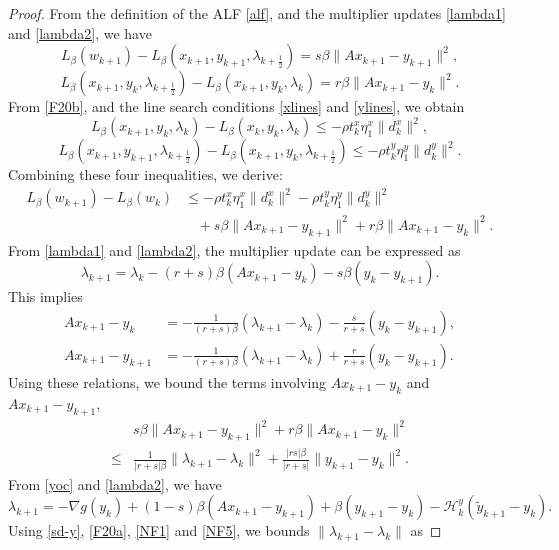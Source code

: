 \documentclass[pdflatex,sn-mathphys-num]{sn-jnl}%
\theoremstyle{thmstyleone}%
\theoremstyle{thmstyletwo}%
\theoremstyle{thmstylethree}%
\begin{document}
\begin{proof} From the definition of the ALF \eqref{alf}, and the multiplier updates \eqref{lambda1} and \eqref{lambda2}, we have
	\[
	L_{\beta}(w_{k+1})-L_{\beta}(x_{k+1}, y_{k+1}, \lambda_{k+\frac{1}{2}})=s \beta\|A x_{k+1}-y_{k+1}\|^{2},\]
	\[L_{\beta}(x_{k+1}, y_{k}, \lambda_{k+\frac{1}{2}})-L_{\beta}(x_{k+1}, y_{k}, \lambda_{k})=r \beta\|A x_{k+1}-y_{k}\|^{2}.\]
	From \eqref{F20b}, and the line search conditions \eqref{xlines} and \eqref{ylines}, we obtain
	\[
	L_{\beta}(x_{k+1}, y_{k}, \lambda_{k})-L_{\beta}(x_{k}, y_{k}, \lambda_{k})\leq-\rho t_k^x\eta^x_1 \|d_{k}^{x}\|^{2}, 
	\]
	\[
	L_{\beta}(x_{k+1}, y_{k+1}, \lambda_{k+\frac{1}{2}})-L_{\beta}(x_{k+1}, y_{k}, \lambda_{k+\frac{1}{2}}) \leq- \rho t_k^y\eta^y_1 \|d_{k}^{y}\|^{2}.
	\]
	Combining these four inequalities, we derive:
	\begin{align}
		{L}_{\beta}({w}_{k+1})-{L}_{\beta}({w}_{k}) &\leq -\rho t_k^x\eta^x_1 \|d_{k}^{x}\|^{2}-\rho t_k^y\eta^y_1 \|d_{k}^{y}\|^{2}\nonumber\\
		&\ \ \ \ +s \beta\|A x_{k+1}-y_{k+1}\|^{2}+r \beta\|A x_{k+1}-y_{k}\|^{2}.\label{meritL}
	\end{align}
	From \eqref{lambda1} and \eqref{lambda2}, the multiplier update can be expressed as
	\[\lambda_{k+1}=\lambda_k-(r+s)\beta(Ax_{k+1}-y_k)-s\beta(y_k-y_{k+1}).\]
	This implies
	\begin{align}
		A x_{k+1}-y_{k}&=-\frac{1}{(r+s) \beta}(\lambda_{k+1}-\lambda_{k})-\frac{s}{r+s}(y_{k}-y_{k+1}), \nonumber\\
		A x_{k+1}-y_{k+1}&=-\frac{1}{(r+s) \beta}(\lambda_{k+1}-\lambda_{k})+\frac{r}{r+s}(y_{k}-y_{k+1}). \label{lam2}
	\end{align}
	Using these relations, we bound the terms involving $A x_{k+1}-y_{k}$ and $A x_{k+1}-y_{k+1}$,
	\begin{align}
		&s \beta\|A x_{k+1}-y_{k+1}\|^{2}+r \beta\|A x_{k+1}-y_{k}\|^{2}\nonumber\\
		\leq&\frac{1}{|r+s|\beta}\|\lambda_{k+1}-\lambda_{k}\|^2+\frac{|rs|\beta}{|r+s|}\|y_{k+1}-y_{k}\|^2.\label{sr}
	\end{align}
	From \eqref{yoc} and \eqref{lambda2}, we have
	\begin{equation}\label{lambdak1}
		\lambda_{k+1}=-\nabla g (y_{k})+(1-s)\beta(A x_{k+1}-y_{k+1})+\beta(y_{k+1}-y_k)-\mathcal{H}_k^y (\tilde{y}_{k+1}-y_{k}).
	\end{equation}
	Using \eqref{sd-y}, \eqref{F20a}, \eqref{NF1} and \eqref{NF5}, we bounds $\|\lambda_{k+1}-\lambda_{k}\|$ as

\end{proof}
\end{document}
